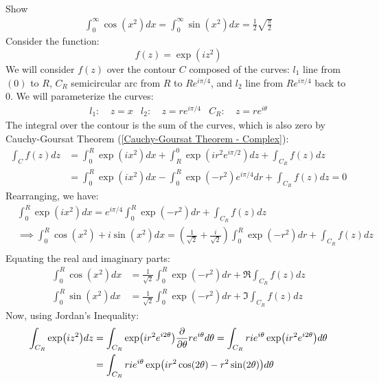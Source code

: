 \documentclass[12pt, english]{book}
\begin{document}
	\begin{example}
		\label{Fresnel Integrals Derivation Example - Complex}
		Show
		\begin{align*}
			\int_{0}^{\infty} \cos(x^2) dx = \int_{0}^{\infty} \sin(x^2) dx 
			= \frac{1}{2}\sqrt{\frac{\pi}{2}}
		\end{align*}
		{\color{Grey}
		Consider the function: \[f(z) = \exp(iz^2)\]
		We will consider \(f(z)\) over the contour \(C\) composed of the curves: \(l_1\) line from \((0)\) to \(R\), \(C_R\) semicircular arc from \(R\) to \(Re^{i\pi/4}\), and \(l_2\) line from \(Re^{i\pi/4}\) back to \(0\). We will parameterize the curves:
		\begin{align*}
			l_1: &\ z=x 	&
			l_2: &\ z=re^{i\pi/4} &
			C_R: &\ z=re^{i\theta}
		\end{align*}
		The integral over the contour is the sum of the curves, which is also zero by Cauchy-Goursat Theorem (\cref{Cauchy-Goursat Theorem - Complex}): 
		\begin{align*}
			\int_{C} f(z) dz
			&= \int_{0}^{R} \exp(ix^2) dx + \int_{R}^{0} \exp(ir^2 e^{i\pi/2}) dz + \int_{C_R} f(z) dz \\
			&= \int_{0}^{R} \exp(ix^2) dx - \int_{0}^{R} \exp(-r^2) e^{i\pi/4} dr + \int_{C_R} f(z) dz = 0
		\end{align*}
		Rearranging, we have:
		\begin{align*}
			&\int_{0}^{R} \exp(ix^2) dx = e^{i\pi/4} \int_{0}^{R} \exp(-r^2) dr + \int_{C_R} f(z) dz \\
			&\implies \int_{0}^{R} \cos(x^2) + i\sin(x^2) dx
			= \left(\frac{1}{\sqrt{2}} + \frac{i}{\sqrt{2}} \right) \int_{0}^{R} \exp(-r^2) dr + \int_{C_R} f(z) dz \\
		\end{align*}
		Equating the real and imaginary parts:
		\begin{align*}
			\int_{0}^{R} \cos(x^2) dx 
			&= \frac{1}{\sqrt{2}} \int_{0}^{R} \exp(-r^2) dr + \Re{\int_{C_R} f(z) dz} \\
			\int_{0}^{R} \sin(x^2) dx 
			&= \frac{1}{\sqrt{2}} \int_{0}^{R} \exp(-r^2) dr + \Im{\int_{C_R} f(z) dz}
		\end{align*}
		Now, using Jordan's Inequality:
		\begin{align*}
			\int_{C_R} \exp(iz^2) dz 
			&= \int_{C_R} \exp(ir^2 e^{i2\theta}) \pdv{\theta} re^{i\theta} d\theta 
			 = \int_{C_R} rie^{i\theta} \exp(ir^2e^{i2\theta}) d\theta \\
			&= \int_{C_R} rie^{i\theta} \exp(ir^2\cos(2\theta) - r^2\sin(2\theta)) d\theta \\

\end{align*}}
\end{example}
\end{document}
